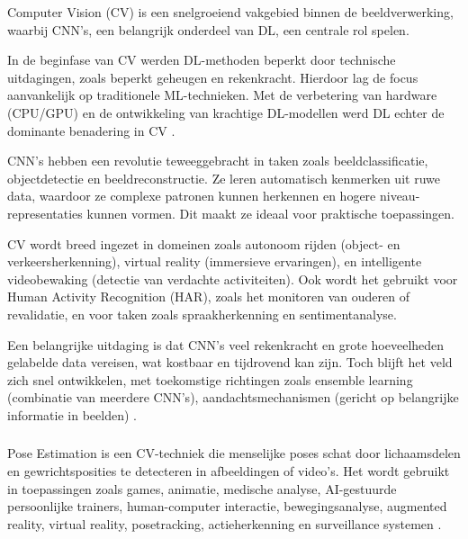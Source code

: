 Computer Vision (CV) is een snelgroeiend vakgebied binnen de beeldverwerking, waarbij CNN's, een belangrijk onderdeel van DL, een centrale rol spelen.  

\medskip

In de beginfase van CV werden DL-methoden beperkt door technische uitdagingen, zoals beperkt geheugen en rekenkracht. 
Hierdoor lag de focus aanvankelijk op traditionele ML-technieken. 
Met de verbetering van hardware (CPU/GPU) en de ontwikkeling van krachtige DL-modellen werd DL echter de dominante benadering in CV \autocite{ChaiEtAl2021}.

\medskip

CNN's hebben een revolutie teweeggebracht in taken zoals beeldclassificatie, objectdetectie en beeldreconstructie. 
Ze leren automatisch kenmerken uit ruwe data, waardoor ze complexe patronen kunnen herkennen en hogere niveau-representaties kunnen vormen. 
Dit maakt ze ideaal voor praktische toepassingen. 

\medskip

CV wordt breed ingezet in domeinen zoals autonoom rijden (object- en verkeersherkenning), virtual reality (immersieve ervaringen), en intelligente videobewaking (detectie van verdachte activiteiten). 
Ook wordt het gebruikt voor Human Activity Recognition (HAR), zoals het monitoren van ouderen of revalidatie, en voor taken zoals spraakherkenning en sentimentanalyse. 

\medskip

Een belangrijke uitdaging is dat CNN's veel rekenkracht en grote hoeveelheden gelabelde data vereisen, wat kostbaar en tijdrovend kan zijn. 
Toch blijft het veld zich snel ontwikkelen, met toekomstige richtingen zoals ensemble learning (combinatie van meerdere CNN's), aandachtsmechanismen (gericht op belangrijke informatie in beelden) \autocite{ZhaoEtAl2024}. 

\subsubsection{}%
\label{subsubsec:pose-estimation}
 
Pose Estimation is een CV-techniek die menselijke poses schat door lichaamsdelen en gewrichtsposities te detecteren in afbeeldingen of video's. 
Het wordt gebruikt in toepassingen zoals games, animatie, medische analyse, AI-gestuurde persoonlijke trainers, human-computer interactie, bewegingsanalyse, augmented reality, virtual reality, posetracking, actieherkenning en surveillance systemen \autocite{SiddharthEtAl2021}.

